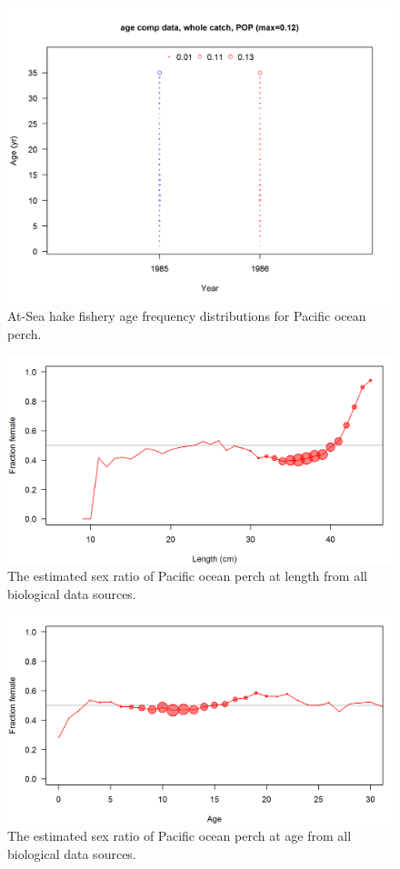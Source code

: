 \documentclass[12pt,]{article}
\begin{document}
\begin{figure}
\centering
\includegraphics{r4ss/plots_mod1/comp_agedat_bubflt2mkt0.png}
\caption{At-Sea hake fishery age frequency distributions for Pacific
ocean perch. \label{fig:ASHOP_Age}}
\end{figure}

\FloatBarrier

\begin{figure}
\centering
\includegraphics{Figures/allSexRatios.png}
\caption{The estimated sex ratio of Pacific ocean perch at length from
all biological data sources. \label{fig:sexratio}}
\end{figure}

\begin{figure}
\centering
\includegraphics{Figures/allSexRatiosAge.png}
\caption{The estimated sex ratio of Pacific ocean perch at age from all
biological data sources. \label{fig:sexratio_Age}}
\end{figure}
\end{document}
